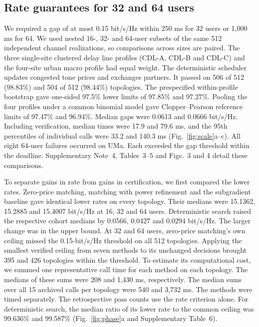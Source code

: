 \subsection*{Rate guarantees for 32 and 64 users}

We required a gap of at most 0.15 bit/s/Hz within 250 ms for 32 users or 1,000 ms for 64. We used nested 16-, 32- and 64-user subsets of the same 512 independent channel realizations, so comparisons across sizes are paired. The three single-site clustered delay line profiles (CDL-A, CDL-B and CDL-C) and the four-site urban macro profile had equal weight. The deterministic scheduler updates congested tone prices and exchanges partners. It passed on 506 of 512 (98.83\%) and 504 of 512 (98.44\%) topologies. The prespecified within-profile bootstrap gave one-sided 97.5\% lower limits of 97.85\% and 97.27\%. Pooling the four profiles under a common binomial model gave Clopper--Pearson reference limits of 97.47\% and 96.94\%. Median gaps were 0.0613 and 0.0666 bit/s/Hz. Including verification, median times were 17.9 and 79.6 ms, and the 95th percentiles of individual calls were 33.2 and 140.3 ms (Fig.~\ref{fig:scale}a--c). All eight 64-user failures occurred on UMa. Each exceeded the gap threshold within the deadline. Supplementary Note~4, Tables~3--5 and Figs.~3 and 4 detail these comparisons.


To separate gains in rate from gains in certification, we first compared the lower rates. Zero-price matching, matching with power refinement and the subgradient baseline gave identical lower rates on every topology. Their medians were 15.1362, 15.2885 and 15.4007 bit/s/Hz at 16, 32 and 64 users. Deterministic search raised the respective cohort medians by 0.0566, 0.0427 and 0.0294 bit/s/Hz. The larger change was in the upper bound. At 32 and 64 users, zero-price matching's own ceiling missed the 0.15-bit/s/Hz threshold on all 512 topologies. Applying the smallest verified ceiling from seven methods to its unchanged decisions brought 395 and 426 topologies within the threshold. To estimate its computational cost, we summed one representative call time for each method on each topology. The medians of these sums were 208 and 1,430 ms, respectively. The median sums over all 15 archived calls per topology were 540 and 3,732 ms. The methods were timed separately. The retrospective pass counts use the rate criterion alone. For deterministic search, the median ratio of its lower rate to the common ceiling was 99.636\% and 99.587\% (Fig.~\ref{fig:phase}a and Supplementary Table~6).


